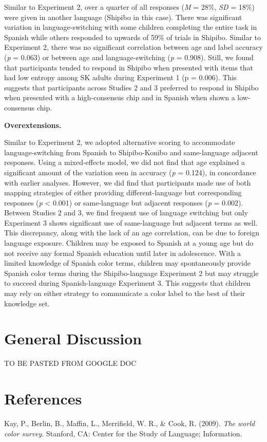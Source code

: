\documentclass[,man,floatsintext]{apa6}
\theoremstyle{definition}
\theoremstyle{definition}
\theoremstyle{definition}
\theoremstyle{remark}
\begin{document}
Similar to Experiment 2, over a quarter of all responses (\emph{M} =
28\%, \emph{SD} = 18\%) were given in another language (Shipibo in this
case). There was significant variation in language-switching with some
children completing the entire task in Spanish while others responded to
upwards of 59\% of trials in Shipibo. Similar to Experiment 2, there was
no significant correlation between age and label accuracy (\emph{p} =
0.063) or between age and language-switching (\emph{p} = 0.908). Still,
we found that participants tended to respond in Shipibo when presented
with items that had low entropy among SK adults during Experiment 1 (p =
0.006). This suggests that participants across Studies 2 and 3 preferred
to respond in Shipibo when presented with a high-consensus chip and in
Spanish when shown a low-consensus chip.

\textbf{Overextensions.}

Similar to Experiment 2, we adopted alternative scoring to accommodate
language-switching from Spanish to Shipibo-Konibo and same-language
adjacent responses. Using a mixed-effects model, we did not find that
age explained a significant amount of the variation seen in accuracy
(\emph{p} = 0.124), in concordance with earlier analyses. However, we
did find that participants made use of both mapping strategies of either
providing different-language but corresponding responses (\emph{p}
\textless{} 0.001) or same-language but adjacent responses (\emph{p} =
0.002). Between Studies 2 and 3, we find frequent use of language
switching but only Experiment 3 shows significant use of same-language
but adjacent terms as well. This discrepancy, along with the lack of an
age correlation, can be due to foreign language exposure. Children may
be exposed to Spanish at a young age but do not receive any formal
Spanish education until later in adolescence. With a limited knowledge
of Spanish color terms, children may spontaneously provide Spanish color
terms during the Shipibo-language Experiment 2 but may struggle to
succeed during Spanish-language Experiment 3. This suggests that
children may rely on either strategy to communicate a color label to the
best of their knowledge set.

\section{General Discussion}\label{general-discussion}

TO BE PASTED FROM GOOGLE DOC

\newpage

\section{References}\label{references}

\begingroup
\setlength{\parindent}{-0.5in} \setlength{\leftskip}{0.5in}

\hypertarget{refs}{}
\hypertarget{ref-berlin2009}{}
Kay, P., Berlin, B., Maffin, L., Merrifield, W. R., \& Cook, R. (2009).
\emph{The world color survey}. Stanford, CA: Center for the Study of
Language; Information.

\endgroup
\end{document}
